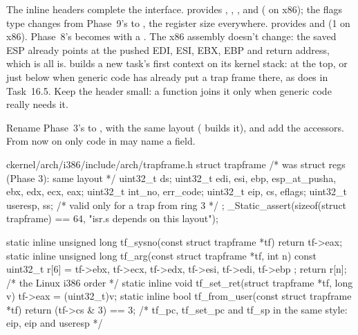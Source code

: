 \documentclass[11pt,a4paper]{article}
\begin{document}
The inline headers complete the interface.  provides ,
, ,  and 
( on x86); the flags type changes from Phase~9's  to , the register
size everywhere.  provides  and  (1 on x86).
Phase~8's  becomes  with a
. The x86 assembly doesn't change: the saved ESP already points at the pushed EDI, ESI, EBX,
EBP and return address, which is all  is.  builds a new task's first context
on its kernel stack: at the top, or just below  when generic code has already put a trap frame there, as
 does in Task~16.5. Keep the header small: a function joins it only when generic code really needs it.

Rename Phase~3's  to , with the same layout ( builds it), and add
the accessors. From now on only code in  may name a field.

\begin{lst}{c}{kernel/arch/i386/include/arch/trapframe.h}
struct trapframe {                       /* was struct regs (Phase 3): same layout */
    uint32_t ds;
    uint32_t edi, esi, ebp, esp_at_pusha, ebx, edx, ecx, eax;
    uint32_t int_no, err_code;
    uint32_t eip, cs, eflags;
    uint32_t useresp, ss;                /* valid only for a trap from ring 3 */
};
_Static_assert(sizeof(struct trapframe) == 64, "isr.s depends on this layout");

static inline unsigned long tf_sysno(const struct trapframe *tf) { return tf->eax; }
static inline unsigned long tf_arg(const struct trapframe *tf, int n)
{
    const uint32_t r[6] = { tf->ebx, tf->ecx, tf->edx, tf->esi, tf->edi, tf->ebp };
    return r[n];                         /* the Linux i386 order */
}
static inline void tf_set_ret(struct trapframe *tf, long v) { tf->eax = (uint32_t)v; }
static inline bool tf_from_user(const struct trapframe *tf) { return (tf->cs & 3) == 3; }
/* tf_pc, tf_set_pc and tf_sp in the same style: eip, eip and useresp */
\end{lst}
\end{document}
